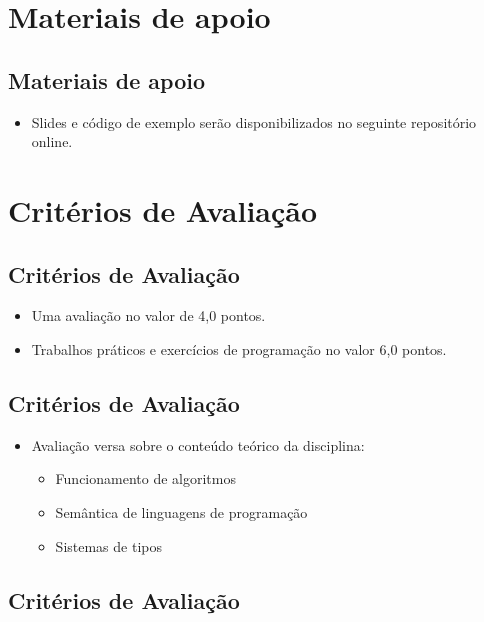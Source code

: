 \documentclass[11pt]{article}
\begin{document}
\section*{Materiais de apoio}
\label{sec:org36c033a}

\subsection*{Materiais de apoio}
\label{sec:org6881e7e}

\begin{itemize}
\item Slides e código de exemplo serão disponibilizados no seguinte repositório online.
\end{itemize}
\section*{Critérios de Avaliação}
\label{sec:org4821a03}

\subsection*{Critérios de Avaliação}
\label{sec:orgb6e7872}

\begin{itemize}
\item Uma avaliação no valor de 4,0 pontos.

\item Trabalhos práticos e exercícios de programação no valor 6,0 pontos.
\end{itemize}
\subsection*{Critérios de Avaliação}
\label{sec:org6a91f14}

\begin{itemize}
\item Avaliação versa sobre o conteúdo teórico da disciplina:
\begin{itemize}
\item Funcionamento de algoritmos
\item Semântica de linguagens de programação
\item Sistemas de tipos
\end{itemize}
\end{itemize}
\subsection*{Critérios de Avaliação}
\label{sec:orgbfb13c8}
\end{document}
